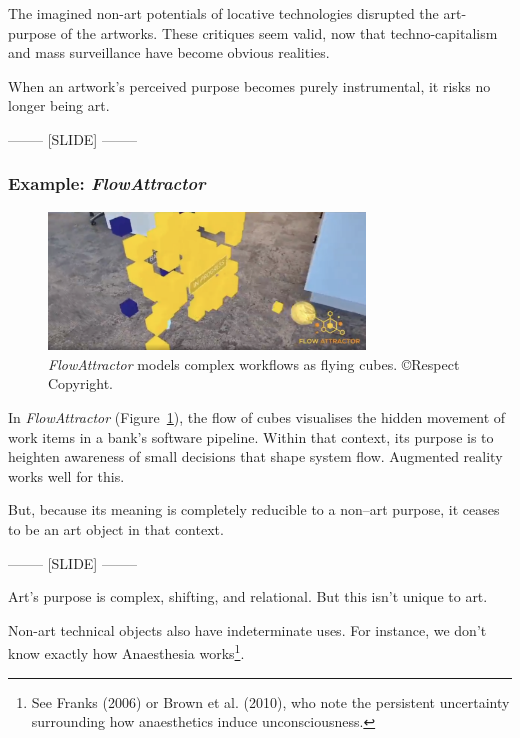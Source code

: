 \documentclass[letter:wpaper]{article}
\begin{document}
    The imagined non-art potentials of locative technologies disrupted the art-purpose of the artworks. These critiques seem valid, now that techno-capitalism and mass surveillance have become obvious realities.

    When an artwork’s perceived purpose becomes purely instrumental, it risks no longer being art.

    -------- [SLIDE] --------

    \subsubsection{Example: \emph{FlowAttractor}}

    \begin{figure}[h]
        \includegraphics[width=3.31in]{flow-attractor.png}
        \caption{\emph{FlowAttractor} models complex workflows as flying cubes. \copyright Respect Copyright.}
        \label{fig:flow-attractor}
    \end{figure}

    In \emph{FlowAttractor} (Figure~\ref{fig:flow-attractor}), the flow of cubes visualises the hidden movement of work items in a bank’s software pipeline. Within that context, its purpose is to heighten awareness of small decisions that shape system flow. Augmented reality works well for this.

    But, because its meaning is completely reducible to a non–art purpose, it ceases to be an art object in that context.

    -------- [SLIDE] --------

    Art’s purpose is complex, shifting, and relational. But this isn’t unique to art.

    Non-art technical objects also have indeterminate uses. For instance, we don't know exactly how Anaesthesia works\footnote{
        See Franks (2006) or Brown et al. (2010), who note the persistent uncertainty surrounding how anaesthetics induce unconsciousness.
    }.
\end{document}
